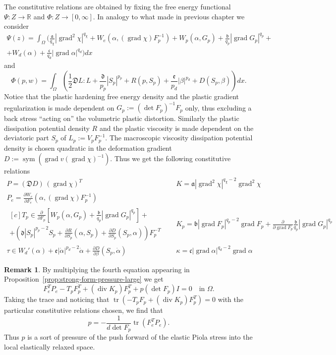 \documentclass[a4paper,10pt,oneside]{amsbook}
\numberwithin{section}{chapter}
\numberwithin{equation}{chapter}
\theoremstyle{definition}
\newtheorem{rmk}[prop]{Remark}
\DeclareMathOperator{\diver}{div}
\DeclareMathOperator{\tr}{tr}
\DeclareMathOperator{\sym}{sym}
\DeclareMathOperator{\grad}{grad}
\newcommand{\dind}[2]{\frac{\partial #1}{\partial #2}}
\begin{document}
The constitutive relations are obtained by fixing the free energy functional $\Psi\colon Z\to\mathbb{R}$ and $\Phi\colon Z\to[0,\infty]$. In analogy to what made in previous chapter we consider
\[
\begin{multlined}
\Psi(z)=\int_\Omega\bigg(\frac{\mathfrak{a}}{q_{\chi}}|\grad^2\chi|^{q_\chi}+W_e\left(\alpha,(\grad\chi)F_p^{-1}\right)+W_p(\alpha,G_p)+\frac{\mathfrak{b}}{q_p}|\grad G_p|^{q_p}+\\
+W_d(\alpha)+\frac{\mathfrak{c}}{q_d}|\grad\alpha|^{q_d}\bigg)dx
\end{multlined}
\]
and
\[
\Phi(p,w)=\int_\Omega\left(\frac{1}{2}\mathfrak{D}L:L+\frac{\mathfrak{d}}{p_p}|S_p|^{p_p}+R(p,S_p)+\frac{\mathfrak{e}}{p_d}|\beta|^{p_d}+D(S_p,\beta)\right)dx.
\]
Notice that the plastic hardening free energy density and the plastic gradient regularization is made dependent on $G_p:=(\det F_p)^{-1}F_p$ only, thus excluding a back stress ``acting on'' the volumetric plastic distortion. Similarly the plastic dissipation potential density $R$ and the plastic viscosity is made dependent on the deviatoric part $S_p$ of $L_p:=V_pF_p^{-1}$. The macroscopic viscosity dissipation potential density is chosen quadratic in the deformation gradient $D:=\sym\left(\grad v(\grad\chi)^{-1}\right)$. Thus we get the following constitutive relations
\begin{align}
P=(\mathfrak{D}D)\,(\grad\chi)^T\quad & K=\mathfrak{a}|\grad^2\chi|^{q_\chi-2}\grad^2\chi \\
P_e=\dind{W_e}{F_e}(\alpha,(\grad\chi)F_p^{-1})\quad & \\
\begin{multlined}[c]
T_p\in\dind{}{F_p}\left[W_p(\alpha,G_p)+\frac{\mathfrak{b}}{q_p}|\grad G_p|^{q_p}\right]
+\\
+\left(\mathfrak{d}|S_p|^{p_p-2}S_p+\dind{R}{S_p}(\alpha,S_p)+\dind{D}{S_p}(S_p,\alpha)\right)F_p^{-T}
\end{multlined}\quad & K_p=\mathfrak{b}|\grad F_p|^{q_p-2}\grad F_p+\dind{}{\grad F_p}\frac{\mathfrak{b}}{q_p}|\grad G_p|^{q_p} \\
\tau\in W_d'(\alpha)+\mathfrak{e}|\dot\alpha|^{p_d-2}\dot\alpha+\dind{D}{\beta}(S_p,\dot\alpha)\quad & \kappa=\mathfrak{c}|\grad\alpha|^{q_d-2}\grad\alpha
\end{align}

\begin{rmk}
By multiplying the fourth equation appearing in Proposition~\ref{prop:strong-form-pressure-large} we get
\[
F_e^TP_e-T_pF_p^T+(\diver K_p)F_p^T+p(\det F_p)I=0\quad\text{in $\Omega$}.
\]
Taking the trace and noticing that $\tr(-T_pF_p+(\diver K_p)F_p^T)=0$ with the particular constitutive relations chosen, we find that
\[
p=-\frac{1}{d\det F_p}\tr(F_e^TP_e).
\]
Thus $p$ is a sort of pressure of the push forward of the elastic Piola stress into the local elastically relaxed space.
\end{rmk}
\end{document}
